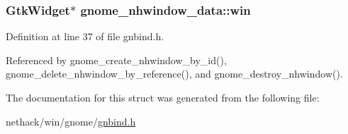 \hypertarget{structgnome__nhwindow__data_a24bf197b2e6d5303bce3716337761b8b}{
\subsubsection[{win}]{\setlength{\rightskip}{0pt plus 5cm}Gtk\+Widget$\ast$ gnome\+\_\+nhwindow\+\_\+data\+::win}}\label{structgnome__nhwindow__data_a24bf197b2e6d5303bce3716337761b8b}


Definition at line 37 of file gnbind.\+h.



Referenced by gnome\+\_\+create\+\_\+nhwindow\+\_\+by\+\_\+id(), gnome\+\_\+delete\+\_\+nhwindow\+\_\+by\+\_\+reference(), and gnome\+\_\+destroy\+\_\+nhwindow().



The documentation for this struct was generated from the following file\+:\begin{DoxyCompactItemize}
\item 
nethack/win/gnome/\hyperlink{gnbind_8h}{gnbind.\+h}\end{DoxyCompactItemize}
